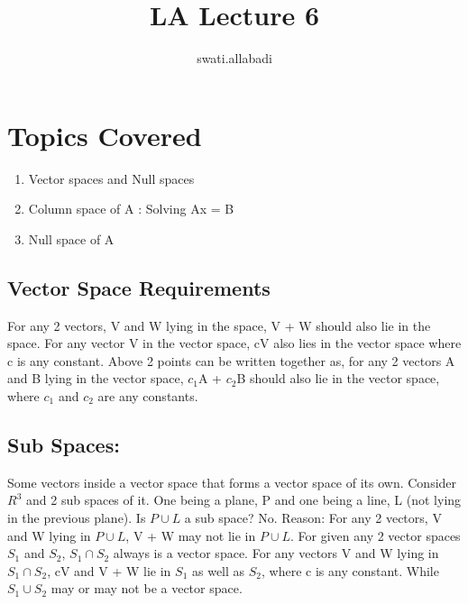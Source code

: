 \documentclass{article}
\title{LA Lecture 6}
\author{swati.allabadi }
\begin{document}
\maketitle

\section{Topics Covered}
\begin{enumerate}
    \item Vector spaces and Null spaces
    \item Column space of A : Solving Ax = B
    \item Null space of A
    
\end{enumerate}
\subsection{Vector Space Requirements}
\newline
For any 2 vectors, V and W lying in the space, V + W should also lie in the space. \newline
For any vector V in the vector space, cV also lies in the vector space where c is any constant.
\newline
Above 2 points can be written together as, for any 2 vectors A and B lying in the vector space, $c_1$A + $c_2$B should also lie in the vector space, where $c_1$ and $c_2$ are any constants.

\subsection{Sub Spaces:} Some vectors inside a vector space that forms a vector space of its own. 
\newline
Consider $R^3$ and 2 sub spaces of it. One being a plane, P and one being a line, L (not lying in the previous plane). Is $P \cup L$ a sub space?
\newline
No. Reason: For any 2 vectors, V and W lying in $P \cup L$, V + W may not lie in $P \cup L$. 
\newline
For given any 2 vector spaces $S_1$ and $S_2$, $S_1 \cap S_2$ always is a vector space. For any vectors V  and W lying in $S_1 \cap S_2$, cV and V + W lie in $S_1$ as well as $S_2$, where c is any constant. While $S_1 \cup S_2$ may or may not be a vector space. 
\end{document}
